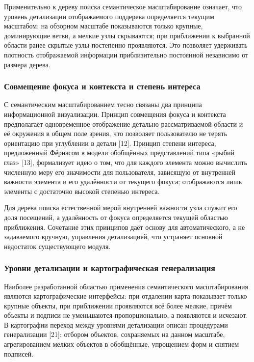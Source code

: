 Применительно к дереву поиска семантическое масштабирование означает, что уровень детализации отображаемого поддерева определяется текущим масштабом: на обзорном масштабе показываются только крупные, доминирующие ветви, а мелкие узлы скрываются; при приближении к выбранной области ранее скрытые узлы постепенно проявляются. Это позволяет удерживать плотность отображаемой информации приблизительно постоянной независимо от размера дерева.

\subsubsection{Совмещение фокуса и контекста и степень интереса}

С семантическим масштабированием тесно связаны два принципа информационной визуализации. Принцип совмещения фокуса и контекста предполагает одновременное отображение детально рассматриваемой области и её окружения в общем поле зрения, что позволяет пользователю не терять ориентацию при углублении в детали [12]. Принцип степени интереса, предложенный Фёрнасом в модели обобщённых представлений типа «рыбий глаз» [13], формализует идею о том, что для каждого элемента можно вычислить численную меру его значимости для пользователя, зависящую от внутренней важности элемента и его удалённости от текущего фокуса; отображаются лишь элементы с достаточно высокой степенью интереса.

Для дерева поиска естественной мерой внутренней важности узла служит его доля посещений, а удалённость от фокуса определяется текущей областью приближения. Сочетание этих принципов даёт основу для автоматического, а не задаваемого вручную, управления детализацией, что устраняет основной недостаток существующего модуля.

\subsubsection{Уровни детализации и картографическая генерализация}

Наиболее разработанной областью применения семантического масштабирования являются картографические интерфейсы: при отдалении карта показывает только крупные объекты, при приближении проявляются всё более мелкие, причём объекты и подписи не уменьшаются пропорционально, а появляются и исчезают. В картографии переход между уровнями детализации описан процедурами генерализации [21]: отбором объектов, сохраняемых на данном масштабе, агрегированием мелких объектов в обобщённые, упрощением форм и снятием подписей.

